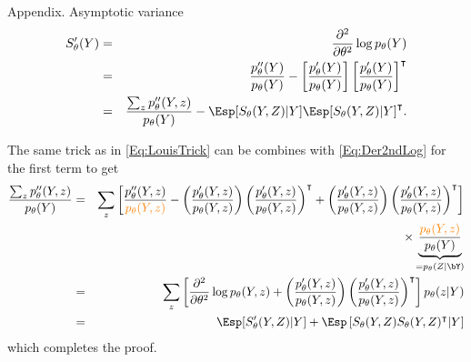 \documentclass[compress,10pt]{beamer}
\begin{document}
\begin{frame}[allowframebreaks]{Appendix. Asymptotic variance}
\begin{eqnarray*}
 S_\theta'(Y) & = & \frac{\partial^2}{\partial \theta^2} \log p_\theta(Y) \\
& = & \frac{p_\theta''(Y)}{p_\theta(Y)} - \left[\frac{p_\theta'(Y)}{p_\theta(Y)}\right]\left[\frac{p_\theta'(Y)}{p_\theta(Y)}\right]^\intercal \\
 & = & \frac{\sum_z p_\theta''(Y, z)}{p_\theta(Y)} - \Esp[S_ \theta(Y, Z) | Y] \Esp[S_ \theta(Y, Z) | Y]^\intercal.
\end{eqnarray*}

The same trick as in \eqref{Eq:LouisTrick} can be combines with \eqref{Eq:Der2ndLog} for the first term to get
{\scriptsize \begin{eqnarray*}
 \frac{\sum_z p_\theta''(Y, z)}{p_\theta(Y)}  
  & = & \sum_z \left[\frac{p_\theta''(Y, z)}{\color{orange}p_\theta(Y, z)} 
  - \left(\frac{p_\theta'(Y, z)}{p_\theta(Y, z)}\right) \left(\frac{p_\theta'(Y, z)}{p_\theta(Y, z)}\right)^\intercal 
  + \left(\frac{p_\theta'(Y, z)}{p_\theta(Y, z)}\right) \left(\frac{p_\theta'(Y, z)}{p_\theta(Y, z)}\right)^\intercal \right] \\
  && \quad \quad \quad  \times \underbrace{\frac{\color{orange}p_\theta(Y, z)}{p_\theta(Y)} }_{=p_\theta(Z| \bY)}\\	
  & = & \sum_z \left[\frac{\partial^2}{\partial \theta^2}  \log p_\theta(Y, z)
  + \left(\frac{p_\theta'(Y, z)}{p_\theta(Y, z)}\right) \left(\frac{p_\theta'(Y, z)}{p_\theta(Y, z)}\right)^\intercal \right] p_\theta(z|Y) \\
  & = &  \Esp[S_\theta'(Y, Z) | Y] +  \Esp\left[S_\theta(Y, Z) S_\theta(Y, Z)^\intercal | Y\right]
\end{eqnarray*}}
which completes the proof. 


\hyperlink{Prop:Louis}{}


\end{frame}
 
\end{document}
